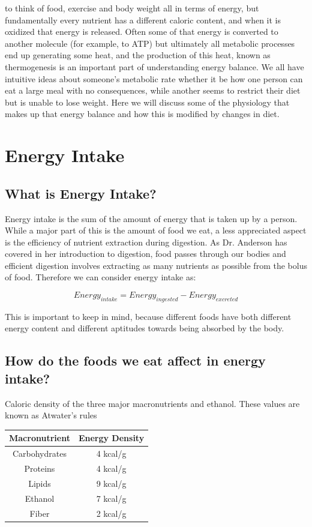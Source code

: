 \documentclass{tufte-handout}
\begin{document}
 to think of food, exercise and body weight all in terms of energy, but fundamentally every nutrient has a different caloric content, and when it is oxidized that energy is released.  Often some of that energy is converted to another molecule (for example, to ATP) but ultimately all metabolic processes end up generating some heat, and the production of this heat, known as thermogenesis is an important part of understanding energy balance.  We all have intuitive ideas about someone's metabolic rate whether it be how one person can eat a large meal with no consequences, while another seems to restrict their diet but is unable to lose weight.  Here we will discuss some of the physiology that makes up that energy balance and how this is modified by changes in diet.

\section{Energy Intake}

\subsection{What is Energy Intake?}
Energy intake is the sum of the amount of energy that is taken up by a person.  While a major part of this is the amount of food we eat, a less appreciated aspect is the efficiency of nutrient extraction during digestion.  As Dr. Anderson has covered in her introduction to digestion, food passes through our bodies and efficient digestion involves extracting as many nutrients as possible from the bolus of food.  Therefore we can consider energy intake as:

\begin{equation}
Energy_{intake} = Energy_{ingested} - Energy_{excreted}
\end{equation}

This is important to keep in mind, because different foods have both different energy content and different aptitudes towards being absorbed by the body.

\subsection{How do the foods we eat affect in energy intake?}

\begin{margintable}
\centering
\caption{Caloric density of the three major macronutrients and ethanol.  These values are known as Atwater's rules}
\label{tab:atwater-values}
\begin{tabular}{cc}
\hline
\textbf{Macronutrient}       & \textbf{Energy Density}                     \\
\hline
Carbohydrates & 4 kcal/g \\
Proteins & 4 kcal/g \\
Lipids & 9 kcal/g \\
Ethanol & 7 kcal/g \\
Fiber & 2 kcal/g \\

\hline
\end{tabular}
\end{margintable}
\end{document}
